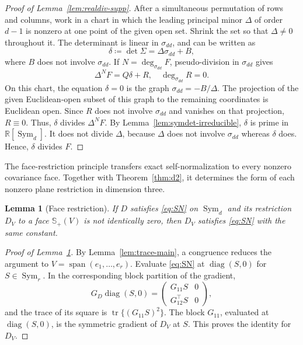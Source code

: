 \documentclass[12pt,a4paper]{article}
\theoremstyle{plain}
\newtheorem{lemma}{Lemma}
\theoremstyle{definition}
\newcommand{\R}{\mathbb{R}}
\newcommand{\Smat}{\mathbb{S}}
\newcommand{\Sym}{\operatorname{Sym}}
\newcommand{\tr}{\operatorname{tr}}
\newcommand{\Span}{\operatorname{span}}
\begin{document}
\begin{proof}[Proof of Lemma~\ref{lem:realdiv-supp}]
    After a simultaneous permutation of rows and columns, work in a chart in which the leading principal minor $\Delta$ of order $d-1$ is nonzero at one point of the given open set.
    Shrink the set so that $\Delta\ne0$ throughout it.
    The determinant is linear in $\sigma_{dd}$, and can be written as
    \begin{equation*}
        \delta
        \coloneqq
        \det\Sigma
        =
        \Delta\sigma_{dd}+B
        ,
    \end{equation*}
    where $B$ does not involve $\sigma_{dd}$.
    If $N=\deg_{\sigma_{dd}}F$, pseudo-division in $\sigma_{dd}$ gives
    \begin{equation*}
        \Delta^NF
        =
        Q\delta+R
        ,
        \quad
        \deg_{\sigma_{dd}}R=0
        .
    \end{equation*}
    On this chart, the equation $\delta=0$ is the graph $\sigma_{dd}=-B/\Delta$.
    The projection of the given Euclidean-open subset of this graph to the remaining coordinates is Euclidean open.
    Since $R$ does not involve $\sigma_{dd}$ and vanishes on that projection, $R\equiv0$.
    Thus, $\delta$ divides $\Delta^NF$.
    By Lemma~\ref{lem:symdet-irreducible}, $\delta$ is prime in $\R[\Sym_d]$.
    It does not divide $\Delta$, because $\Delta$ does not involve $\sigma_{dd}$ whereas $\delta$ does.
    Hence, $\delta$ divides $F$.
\end{proof}

The face-restriction principle transfers exact self-normalization to every nonzero covariance face.
Together with Theorem~\ref{thm:d2}, it determines the form of each nonzero plane restriction in dimension three.

\begin{lemma}[Face restriction]
\label{lem:face-supp}
    If $D$ satisfies \eqref{eq:SN} on $\Sym_d$ and its restriction $D_V$ to a face $\Smat_+(V)$ is not identically zero, then $D_V$ satisfies \eqref{eq:SN} with the same constant.
\end{lemma}

\begin{proof}[Proof of Lemma~\ref{lem:face-supp}]
    By Lemma~\ref{lem:trace-main}, a congruence reduces the argument to $V=\Span(e_1,\ldots,e_r)$.
    Evaluate \eqref{eq:SN} at $\operatorname{diag}(S,0)$ for $S\in\Sym_r$.
    In the corresponding block partition of the gradient,
    \begin{equation*}
        G_D\operatorname{diag}(S,0)
        =
        \begin{pmatrix}G_{11}S&0\\G_{12}^\top S&0\end{pmatrix}
        ,
    \end{equation*}
    and the trace of its square is $\tr\{(G_{11}S)^2\}$.
    The block $G_{11}$, evaluated at $\operatorname{diag}(S,0)$, is the symmetric gradient of $D_V$ at $S$.
    This proves the identity for $D_V$.
\end{proof}
\end{document}
